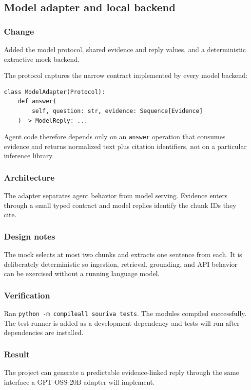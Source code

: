 
\subsection{Model adapter and local backend}


\subsubsection{Change}

Added the model protocol, shared evidence and reply values, and a deterministic extractive mock backend.

The protocol captures the narrow contract implemented by every model backend:

\begin{verbatim}
class ModelAdapter(Protocol):
    def answer(
        self, question: str, evidence: Sequence[Evidence]
    ) -> ModelReply: ...
\end{verbatim}

Agent code therefore depends only on an \texttt{answer} operation that consumes evidence and returns normalized text plus citation identifiers, not on a particular inference library.

\subsubsection{Architecture}

The adapter separates agent behavior from model serving. Evidence enters through a small typed contract and model replies identify the chunk IDs they cite.

\subsubsection{Design notes}

The mock selects at most two chunks and extracts one sentence from each. It is deliberately deterministic so ingestion, retrieval, grounding, and API behavior can be exercised without a running language model.

\subsubsection{Verification}

Ran \texttt{python\ -m\ compileall\ souriva\ tests}. The modules compiled successfully. The test runner is added as a development dependency and tests will run after dependencies are installed.

\subsubsection{Result}

The project can generate a predictable evidence-linked reply through the same interface a GPT-OSS-20B adapter will implement.

